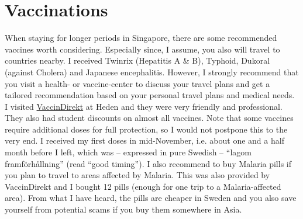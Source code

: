 \section*{Vaccinations}
When staying for longer periods in Singapore, there are some recommended vaccines worth considering. Especially since, I assume, you also will travel to countries nearby. I received Twinrix (Hepatitis A \& B), Typhoid, Dukoral (against Cholera) and Japanese encephalitis. However, I strongly recommend that you visit a health- or vaccine-center to discuss your travel plans and get a tailored recommendation based on your personal travel plans and medical needs. I visited \href{https://vaccindirekt.se/mottagningar/heden-gbg/}{VaccinDirekt} at Heden and they were very friendly and professional. They also had student discounts on almost all vaccines. Note that some vaccines require additional doses for full protection, so I would not postpone this to the very end. I received my first doses in mid-November, i.e. about one and a half month before I left, which was -- expressed in pure Swedish -- ``lagom framförhållning'' (read ``good timing''). I also recommend to buy Malaria pills if you plan to travel to areas affected by Malaria. This was also provided by VaccinDirekt and I bought 12 pills (enough for one trip to a Malaria-affected area). From what I have heard, the pills are cheaper in Sweden and you also save yourself from potential scams if you buy them somewhere in Asia.   
